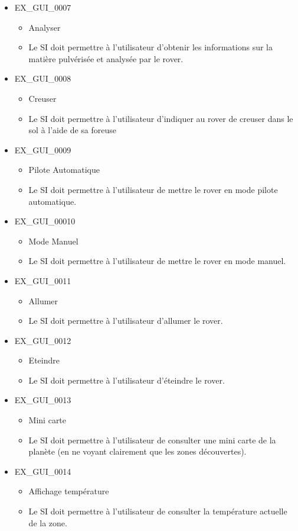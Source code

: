 \documentclass[12pt,a4paper]{scrartcl}
\begin{document}
\begin{itemize}
\item EX\_GUI\_0007
\begin{itemize}
\item Analyser
\item Le SI doit permettre à l'utilisateur d'obtenir les informations sur la
		matière pulvérisée et analysée par le rover.
\end{itemize}

\item EX\_GUI\_0008
\begin{itemize}
\item Creuser
\item Le SI doit permettre à l'utilisateur d'indiquer au rover de creuser dans
		le sol à l'aide de sa foreuse
\end{itemize}

\item EX\_GUI\_0009
\begin{itemize}
\item Pilote Automatique
\item Le SI doit permettre à l'utilisateur de mettre le rover en mode pilote
		automatique.
\end{itemize}

\item EX\_GUI\_00010
\begin{itemize}
\item Mode Manuel
\item Le SI doit permettre à l'utilisateur de mettre le rover en mode manuel.
\end{itemize}

\item EX\_GUI\_0011
\begin{itemize}
\item Allumer
\item Le SI doit permettre à l'utilisateur d'allumer le rover.
\end{itemize}

\item EX\_GUI\_0012
\begin{itemize}
\item Eteindre
\item Le SI doit permettre à l'utilisateur d'éteindre le rover.
\end{itemize}

\item EX\_GUI\_0013
\begin{itemize}
\item Mini carte
\item Le SI doit permettre à l'utilisateur de consulter une mini carte de la planète (en ne voyant clairement que les zones découvertes).
\end{itemize}

\item EX\_GUI\_0014
\begin{itemize}
\item Affichage température
\item Le SI doit permettre à l'utilisateur de consulter la température actuelle
		de la zone.
\end{itemize}

\end{itemize}
\end{document}
